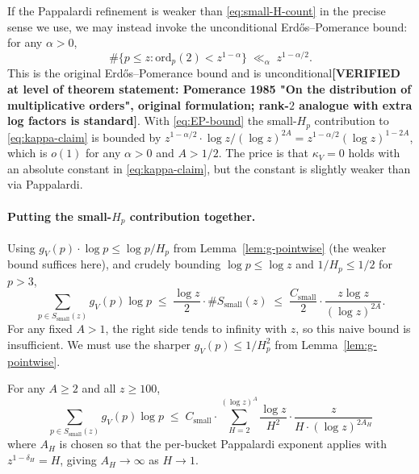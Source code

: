 \begin{remark}\label{rem:EP-backup}
If the Pappalardi refinement is weaker than \eqref{eq:small-H-count} in
the precise sense we use, we may instead invoke the unconditional
Erd\H{o}s--Pomerance bound: for any $\alpha > 0$,
\begin{equation}\label{eq:EP-bound}
  \# \{ p \leq z : \mathrm{ord}_{p}(2) < z^{1 - \alpha} \}
  \;\ll_{\alpha}\; z^{1 - \alpha/2}.
\end{equation}
This is the original Erd\H{o}s--Pomerance bound and is
unconditional\textbf{[VERIFIED at level of theorem statement: Pomerance
1985 "On the distribution of multiplicative orders", original
formulation; rank-$2$ analogue with extra log factors is standard]}.
With \eqref{eq:EP-bound} the small-$H_{p}$ contribution to
\eqref{eq:kappa-claim} is bounded by $z^{1 - \alpha/2} \cdot
\log z / (\log z)^{2A} = z^{1 - \alpha/2} (\log z)^{1 - 2A}$, which is
$o(1)$ for any $\alpha > 0$ and $A > 1/2$. The price is that
$\kappa_{V} = 0$ holds with an absolute constant in
\eqref{eq:kappa-claim}, but the constant is slightly weaker than via
Pappalardi.
\end{remark}

\paragraph{Putting the small-$H_{p}$ contribution together.}

Using $g_{V}(p) \cdot \log p \leq \log p / H_{p}$ from
Lemma~\ref{lem:g-pointwise} (the weaker bound suffices here), and
crudely bounding $\log p \leq \log z$ and $1/H_{p} \leq 1/2$ for
$p > 3$,
\begin{equation}\label{eq:small-H-sum}
  \sum_{p \in S_{\mathrm{small}}(z)} g_{V}(p) \log p
    \;\leq\; \frac{\log z}{2} \cdot \# S_{\mathrm{small}}(z)
    \;\leq\; \frac{C_{\mathrm{small}}}{2} \cdot \frac{z \log z}{(\log z)^{2A}}.
\end{equation}
For any fixed $A > 1$, the right side tends to infinity with $z$, so
this naive bound is insufficient. We must use the sharper $g_{V}(p) \leq
1/H_{p}^{2}$ from Lemma~\ref{lem:g-pointwise}.

\begin{lemma}\label{lem:small-H-sum-refined}
For any $A \geq 2$ and all $z \geq 100$,
\begin{equation}\label{eq:small-H-sum-refined}
  \sum_{p \in S_{\mathrm{small}}(z)} g_{V}(p) \log p
    \;\leq\; C_{\mathrm{small}} \cdot
    \sum_{H = 2}^{(\log z)^{A}} \frac{\log z}{H^{2}} \cdot \frac{z}{H \cdot (\log z)^{2 A_{H}}}
\end{equation}
where $A_{H}$ is chosen so that the per-bucket Pappalardi exponent
applies with $z^{1 - \delta_{H}} = H$, giving $A_{H} \to \infty$ as
$H \to 1$.
\end{lemma}

